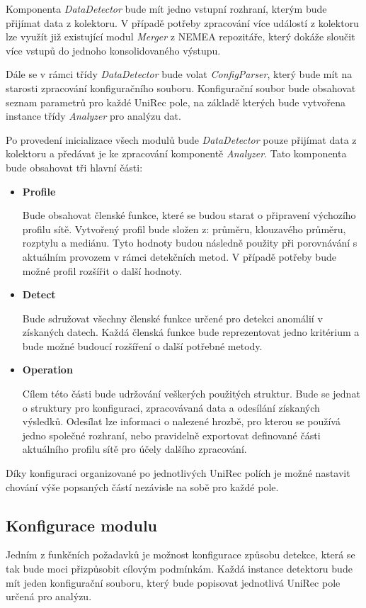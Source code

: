  Komponenta \textit{DataDetector} bude mít jedno vstupní rozhraní, kterým bude přijímat data z kolektoru.
 V případě potřeby
 zpracování více událostí z kolektoru lze využít již existující modul \textit{Merger} z NEMEA repozitáře, který
 dokáže sloučit více vstupů do jednoho konsolidovaného výstupu. 
 
 Dále se v rámci třídy \textit{DataDetector} bude volat \textit{ConfigParser}, který bude mít na starosti zpracování 
 konfiguračního souboru. Konfigurační soubor bude obsahovat seznam parametrů pro každé UniRec pole,
 na základě kterých bude vytvořena instance třídy \textit{Analyzer} pro analýzu dat. 
 
 Po provedení inicializace všech modulů bude \textit{DataDetector} pouze přijímat data z kolektoru a 
 předávat je ke zpracování komponentě \textit{Analyzer}. Tato komponenta bude obsahovat
 tři hlavní části:
 \begin{itemize}
  \item \textbf{Profile}
  
  Bude obsahovat členské funkce, které se budou starat o připravení výchozího profilu sítě. 
  Vytvořený profil bude složen z: průměru, klouzavého průměru, rozptylu a mediánu.
  Tyto hodnoty budou následně použity při porovnávání s aktuálním provozem v rámci detekčních
  metod. V případě potřeby bude možné profil rozšířit o další hodnoty.
  
  \item \textbf{Detect}
  
  Bude sdružovat všechny členské funkce určené pro detekci anomálií v získaných datech. 
  Každá členská funkce bude reprezentovat jedno kritérium a bude možné budoucí rozšíření o další
  potřebné metody.
  
  \item \textbf{Operation}
  
  Cílem této části bude udržování veškerých použitých struktur. Bude se jednat o struktury 
  pro konfiguraci, zpracovávaná data a odesílání získaných výsledků. Odesílat lze informaci o 
  nalezené hrozbě, pro kterou se používá jedno společné rozhraní, nebo pravidelně exportovat
  definované části aktuálního profilu sítě pro účely dalšího zpracování. 
  
 \end{itemize}

 Díky konfiguraci organizované po jednotlivých UniRec polích je možné nastavit chování výše
 popsaných částí nezávisle na sobě pro každé pole.
 
 \subsection{Konfigurace modulu} \label{config_file}
 Jedním z funkčních požadavků je možnost konfigurace způsobu detekce, která se tak bude moci přizpůsobit 
 cílovým podmínkám. Každá instance detektoru bude mít jeden konfigurační souboru, který bude 
 popisovat jednotlivá UniRec pole určená pro analýzu.
 
